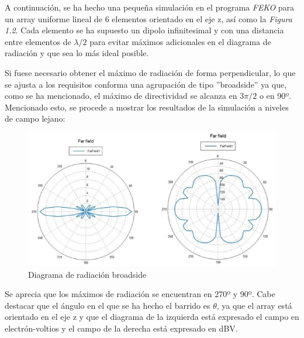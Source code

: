 \documentclass[a4paper,11pt]{book}
\begin{document}
A continuación, se ha hecho una pequeña simulación en el programa \textit{FEKO} para un array uniforme lineal de 6 elementos orientado en el eje z, así como la \textit{Figura 1.2}. Cada elemento se ha supuesto un dipolo infinitesimal y con una distancia entre elementos de $\lambda / 2$ para evitar máximos adicionales en el diagrama de radiación y que sea lo más ideal posible.

Si fuese necesario obtener el máximo de radiación de forma perpendicular, lo que se ajusta a los requisitos conforma una agrupación de tipo ''broadside'' ya que, como se ha mencionado, el máximo de directividad se alcanza en $3 \pi / 2$ o en 90º. Mencionado esto, se procede a mostrar los resultados de la simulación a niveles de campo lejano:
\begin{figure}[hbtp]
\centering
\includegraphics[width = 12cm]{FIGURAS/broadside.JPG}
\caption{Diagrama de radiación broadside}
\end{figure}

Se aprecia que los máximos de radiación se encuentran en 270º y 90º. Cabe destacar que el ángulo en el que se ha hecho el barrido es $\theta$, ya que el array está orientado en el eje z y que el diagrama de la izquierda está expresado el campo en electrón-voltios y el campo de la derecha está expresado en dBV.
\end{document}
